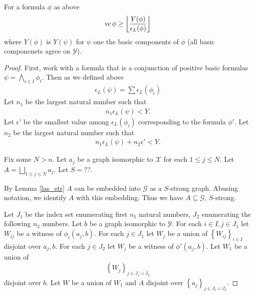 \documentclass{amsart}
\newcommand{\GG}{\mathcal G}
\newcommand{\X}{\mathcal X}
\newcommand{\Y}{\mathcal Y}
\newcommand{\curly}[1]{\left\{#1\right\}}
\newcommand{\agl}[1]{\left\langle #1 \right\rangle}
\providecommand{\floor}[1]{\left \lfloor #1 \right \rfloor }
\begin{document}
\begin{Theorem}
  For a formula $\phi$ as above
  \begin{align*}
    \vc \phi \geq \floor{\frac{Y(\phi)}{\epsilon_L(\phi)}}
  \end{align*}
  where $Y(\phi)$ is $Y(\psi)$ for $\psi$ one the basic components of $\phi$ (all basic componenets agree on $\Y$).
\end{Theorem}

\begin{proof}
  First, work with a formula that is a conjunction of positive basic formulas $\psi = \bigwedge_{i \in I} \phi_i$.
  Then as we defined above
  \begin{align*}
    \epsilon_L(\psi) = \sum \epsilon_L(\phi_i)
  \end{align*}
  Let $n_1$ be the largest natural number such that
  \begin{align*}
    n_1 \epsilon_L(\psi) < Y.
  \end{align*}
  Let $\epsilon'$ be the smallest value among $\epsilon_L(\phi_i)$ corresponding to the formula $\phi'$.
  Let $n_2$ be the largest natural number such that
  \begin{align*}
    n_1 \epsilon_L(\psi) + n_2 \epsilon' < Y.
  \end{align*}

  Fix some $N > n$.
  Let $a_j$ be a graph isomorphic to $\X$ for each $1 \leq j \leq N$.
  Let $A = \bigsqcup_{1 \leq j \leq N} a_j$.
  Let $S = ??$.

  By Lemma \ref{las_str} $A$ can be embedded into $\GG$ as a $S$-strong graph. 
  Abusing notation, we identify $A$ with this embedding.
  Thus we have $A \subseteq \GG$, $S$-strong. 

  Let $J_1$ be the index set enumerating first $n_1$ natural numbers,
  $J_2$ enumerating the following $n_2$ numbers.%
  Let $b$ be a graph isomorphic to $\Y$.
  For each $i \in I, j \in J_1$ let $W_{ij}$ be a witness of $\phi_i(a_j, b)$.
  For each $j \in J_1$ let $W_j$ be a union of $\curly{W_{ij}}_{i \in I}$ disjoint over $a_j, b$.
  For each $j \in J_2$ let $W_{j}$ be a witness of $\phi'(a_j, b)$.
  Let $W_1$ be a union of
  \begin{align*}
    \curly{W_j}_{j \in J_1 \cup J_2}
  \end{align*}
  disjoint over $b$.
  Let $W$ be a union of $W_1$ and $A$ disjoint over $\curly{a_j}_{j \in J_1 \cup J_2}$.


\end{proof}
\end{document}
